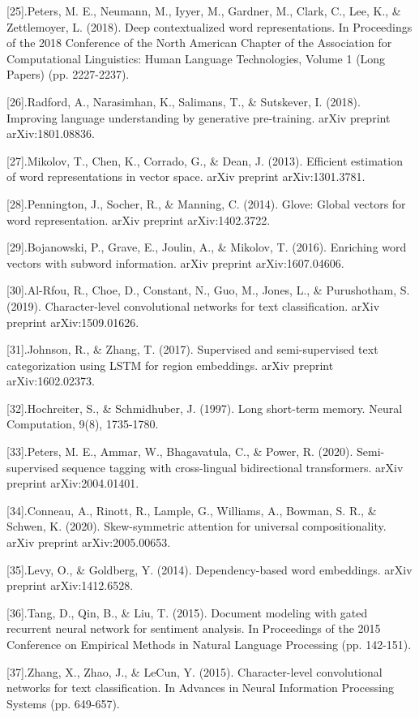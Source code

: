 \documentclass[journal]{IEEEtran}
\begin{document}
[25].Peters, M. E., Neumann, M., Iyyer, M., Gardner, M., Clark, C., Lee, K., & Zettlemoyer, L. (2018). Deep contextualized word representations. In Proceedings of the 2018 Conference of the North American Chapter of the Association for Computational Linguistics: Human Language Technologies, Volume 1 (Long Papers) (pp. 2227-2237).

[26].Radford, A., Narasimhan, K., Salimans, T., & Sutskever, I. (2018). Improving language understanding by generative pre-training. arXiv preprint arXiv:1801.08836.

[27].Mikolov, T., Chen, K., Corrado, G., & Dean, J. (2013). Efficient estimation of word representations in vector space. arXiv preprint arXiv:1301.3781.

[28].Pennington, J., Socher, R., & Manning, C. (2014). Glove: Global vectors for word representation. arXiv preprint arXiv:1402.3722.

[29].Bojanowski, P., Grave, E., Joulin, A., & Mikolov, T. (2016). Enriching word vectors with subword information. arXiv preprint arXiv:1607.04606.

[30].Al-Rfou, R., Choe, D., Constant, N., Guo, M., Jones, L., & Purushotham, S. (2019). Character-level convolutional networks for text classification. arXiv preprint arXiv:1509.01626.

[31].Johnson, R., & Zhang, T. (2017). Supervised and semi-supervised text categorization using LSTM for region embeddings. arXiv preprint arXiv:1602.02373.

[32].Hochreiter, S., & Schmidhuber, J. (1997). Long short-term memory. Neural Computation, 9(8), 1735-1780.

[33].Peters, M. E., Ammar, W., Bhagavatula, C., & Power, R. (2020). Semi-supervised sequence tagging with cross-lingual bidirectional transformers. arXiv preprint arXiv:2004.01401.

[34].Conneau, A., Rinott, R., Lample, G., Williams, A., Bowman, S. R., & Schwen, K. (2020). Skew-symmetric attention for universal compositionality. arXiv preprint arXiv:2005.00653.

[35].Levy, O., & Goldberg, Y. (2014). Dependency-based word embeddings. arXiv preprint arXiv:1412.6528.

[36].Tang, D., Qin, B., & Liu, T. (2015). Document modeling with gated recurrent neural network for sentiment analysis. In Proceedings of the 2015 Conference on Empirical Methods in Natural Language Processing (pp. 142-151).

[37].Zhang, X., Zhao, J., & LeCun, Y. (2015). Character-level convolutional networks for text classification. In Advances in Neural Information Processing Systems (pp. 649-657).
\end{document}
